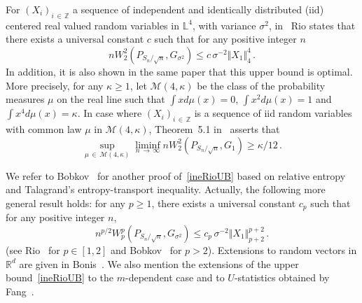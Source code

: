 \documentclass[10pt]{amsart}
\theoremstyle{definition}\newtheorem{defi}[theo]{Definition}\newtheorem{rema}[theo]{Remark}\newtheorem{exam}[theo]{Example}\newtheorem{exem}[theo]{Example}\newtheorem{nota}[theo]{Notation}
\newcommand{\bbZ}{\mathbb{Z}}
\newcommand{\clM}{\mathcal{M}}
\newcommand{\bbR}{\mathbb{R}}
\newcommand{\bbL}{\mathbb{L}}
\begin{document}
For $(X_i)_{i\,\in\,\bbZ}$ a sequence of independent and identically distributed (iid) centered real valued random variables in $\bbL^4$, with variance $\sigma^2$,  in~\cite[inequality (1.7)]{Rio09} Rio states that there exists a universal constant $c$ such that for any positive integer $n$
\begin{equation}\label{ineRioUB}
n W_2^2 \left(P_{S_n / \sqrt n}, G_{\sigma^2}\right) \leq c \, \sigma^{-2} \Vert X_1 \Vert_4^4 \,.
\end{equation}
In addition, it is also shown in the same paper that this upper bound is optimal. More precisely, for any $\kappa \geq 1$, let $\clM(4, \kappa)$ be the class of the probability measures $\mu$ on the real line such that $\int x d \mu (x) = 0$, $\int x^2 d \mu (x) = 1$ and $\int x^4 d \mu (x) = \kappa$. In case where $(X_i)_{i\,\in\,\bbZ}$ is a sequence of iid random variables with common law $\mu $ in $\clM(4, \kappa)$, Theorem~5.1 in~\cite{Rio09} asserts that
\begin{equation}\label{ineRioLB}
\sup_{\mu\,\in\,\clM(4, \kappa)} \liminf_{n\,\rightarrow\,\infty} n W_2^2 \left(P_{S_n / {\sqrt n} }, G_{1}\right) \geq \kappa /12 \,.
\end{equation}

We refer to Bobkov~\cite{Bob13} for another proof of~\eqref{ineRioUB} based on relative entropy and Talagrand's entropy-transport inequality. Actually, the following more general result holds: for any $p \geq 1$, there exists a universal constant $c_p$ such that for any positive integer $n$,
\[
n^{p/2} W_p^p \left(P_{S_n / \sqrt n}, G_{\sigma^2}\right) \leq c_p \, \sigma^{-2} \Vert X_1 \Vert_{p+2}^{p+2} \,.
\]
(see Rio~\cite{Rio09} for $p \in [1,2]$ and Bobkov~\cite{Bob18} for $p>2$). Extensions to random vectors in $\bbR^d$ are given in Bonis~\cite{Bo20}. We also mention the extensions of the upper bound~\eqref{ineRioUB} to the $m$-dependent case and to $U$-statistics obtained by Fang~\cite{Fa19}.
\end{document}
